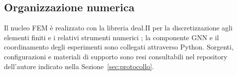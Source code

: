 \subsection{Organizzazione numerica}

Il nucleo FEM è realizzato con la libreria deal.II per la discretizzazione agli elementi finiti e i relativi strumenti numerici \citep{arndt2021dealii}; la componente GNN e il coordinamento degli esperimenti sono collegati attraverso Python. Sorgenti, configurazioni e materiali di supporto sono resi consultabili nel repository dell'autore indicato nella Sezione~\ref{sec:protocollo}.
